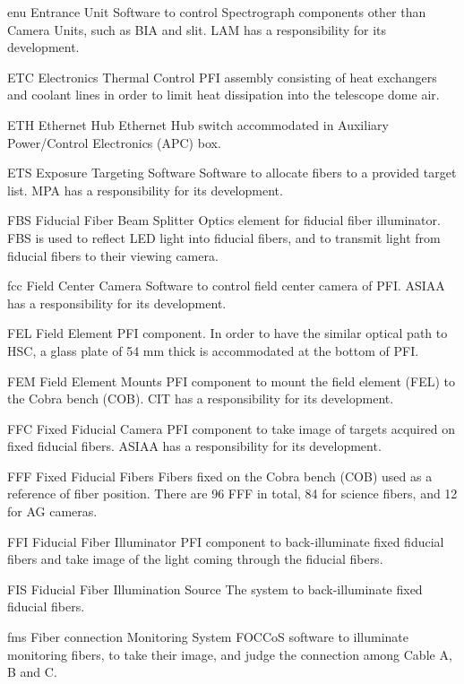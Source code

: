 {enu}
{Entrance Unit}
{Software to control Spectrograph components other than Camera Units, such as BIA and slit. LAM has a responsibility for its development.}


{ETC}
{Electronics Thermal Control}
{PFI assembly consisting of heat exchangers and coolant lines in order to limit heat dissipation into the telescope dome air.}


{ETH}
{Ethernet Hub}
{Ethernet Hub switch accommodated in Auxiliary Power/Control Electronics (APC) box.}


{ETS}
{Exposure Targeting Software}
{Software to allocate fibers to a provided target list. MPA has a responsibility for its development.}


{FBS}
{Fiducial Fiber Beam Splitter}
{Optics element for fiducial fiber illuminator. FBS is used to reflect LED light into fiducial fibers, and to transmit light from fiducial fibers to their viewing camera.}


{fcc}
{Field Center Camera}
{Software to control field center camera of PFI. ASIAA has a responsibility for its development.}


{FEL}
{Field Element}
{PFI component. In order to have the similar optical path to HSC, a glass plate of 54 mm thick is accommodated at the bottom of PFI.}


{FEM}
{Field Element Mounts}
{PFI component to mount the field element (FEL) to the Cobra bench (COB). CIT has a responsibility for its development.}


{FFC}
{Fixed Fiducial Camera}
{PFI component to take image of targets acquired on fixed fiducial fibers. ASIAA has a responsibility for its development.}


{FFF}
{Fixed Fiducial Fibers}
{Fibers fixed on the Cobra bench (COB) used as a reference of fiber position. There are 96 FFF in total, 84 for science fibers, and 12 for AG cameras.}


{FFI}
{Fiducial Fiber Illuminator}
{PFI component to back-illuminate fixed fiducial fibers and take image of the light coming through the fiducial fibers.}


{FIS}
{Fiducial Fiber Illumination Source}
{The system to back-illuminate fixed fiducial fibers.}


{fms}
{Fiber connection Monitoring System}
{FOCCoS software to illuminate monitoring fibers, to take their image, and judge the connection among Cable A, B and C.}


